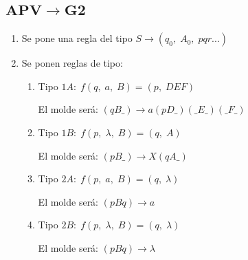 \documentclass[12pt, twoside, openright]{report} %
\begin{document}
\subsection{$\boldsymbol{APV \rightarrow G2}$}
\begin{enumerate}
	\item Se pone una regla del tipo $S \rightarrow (q_0, \; A_0, \; pqr...)$
	\item Se ponen reglas de tipo:
	      \begin{enumerate}
		      \item Tipo $1A: \; f(q, \; a, \; B) = (p, \; DEF)$

		            El molde será: $(qB\_) \rightarrow a(pD\_)(\_E\_)(\_F\_)$

		      \item Tipo $1B: \; f(p, \; \lambda, \; B) = (q, \; A)$

		            El molde será: $(pB\_) \rightarrow X(qA\_)$

		      \item Tipo $2A: \; f(p, \; a, \; B) = (q, \; \lambda)$

		            El molde será: $(pBq) \rightarrow a$

		      \item Tipo $2B: \; f(p, \; \lambda, \; B) = (q, \; \lambda)$

		            El molde será: $(pBq) \rightarrow \lambda$


	      \end{enumerate}
\end{enumerate}
\pagebreak
\end{document}
